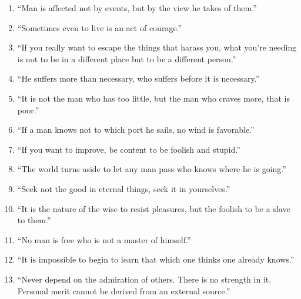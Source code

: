 \documentclass{article}
\begin{document}
\begin{enumerate}
        \item “Man is affected not by events, but by the view he takes of them.”
        \item “Sometimes even to live is an act of courage.”
        \item “If you really want to escape the things that harass you, what you’re needing is not to be in a different place but to be a different person.”
        \item “He suffers more than necessary, who suffers before it is necessary.”
        \item “It is not the man who has too little, but the man who craves more, that is poor.”
        \item “If a man knows not to which port he sails, no wind is favorable.”
        \item “If you want to improve, be content to be foolish and stupid.”
        \item “The world turns aside to let any man pass who knows where he is going.”
        \item “Seek not the good in eternal things, seek it in yourselves.”
        \item “It is the nature of the wise to resist pleasures, but the foolish to be a slave to them.”
        \item “No man is free who is not a master of himself.”
        \item “It is impossible to begin to learn that which one thinks one already knows.”
        \item “Never depend on the admiration of others. There is no strength in it. Personal merit cannot be derived from an external source.”
    \end{enumerate}
\end{document}
